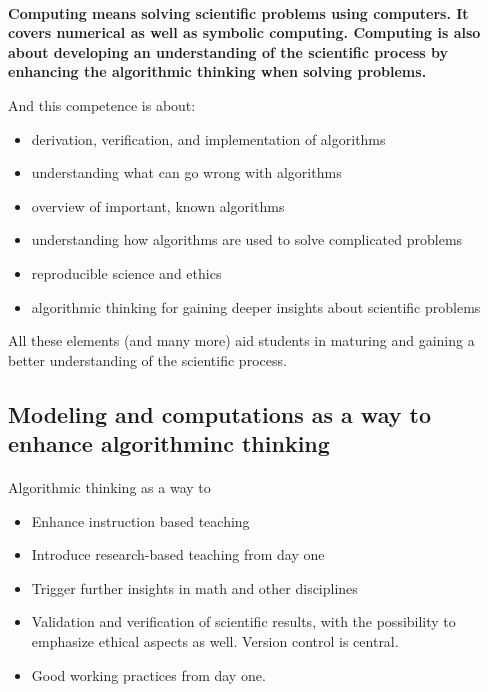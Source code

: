 \documentclass[%
oneside,                 %
final,                   %
10pt]{article}
\begin{document}
\paragraph{}

\textbf{Computing means solving scientific problems using computers. It covers numerical as well as symbolic computing. Computing is also about developing an understanding of the scientific process by enhancing the algorithmic thinking when solving problems.}

And this  competence is about:

\begin{itemize}
\item derivation, verification, and implementation of algorithms

\item understanding what can go wrong with algorithms

\item overview of important, known algorithms

\item understanding how algorithms are used to solve complicated problems

\item reproducible science and ethics

\item algorithmic thinking for gaining deeper insights about scientific problems
\end{itemize}

\noindent
All these elements (and many more) aid students in maturing and gaining a better understanding of the scientific process.




\subsection*{Modeling and computations as a way to enhance algorithminc thinking}

\paragraph{}

Algorithmic  thinking as a way to

\begin{itemize}
\item Enhance instruction based teaching

\item Introduce research-based teaching  from day one

\item Trigger further insights in math and other disciplines 

\item Validation and verification of scientific results, with the possibility to emphasize ethical aspects as well. Version control is central.

\item Good working practices from day one.
\end{itemize}
\end{document}
